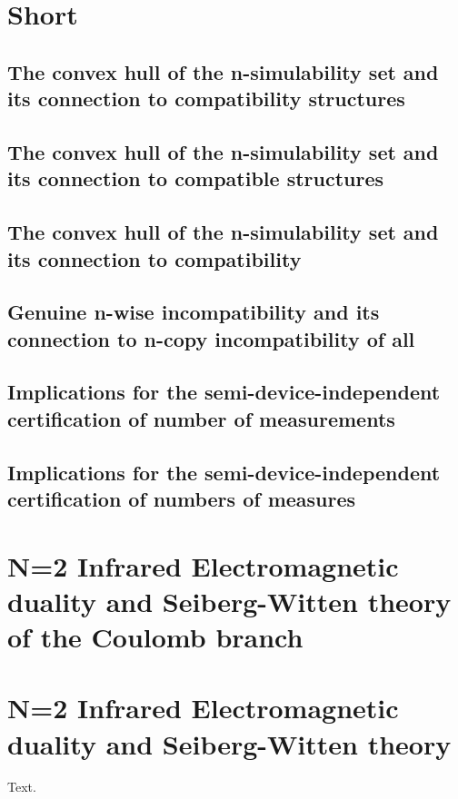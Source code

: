 \documentclass{article}
\begin{document}
\tableofcontents
\section{Short}
\subsection{The convex hull of the n-simulability set and its connection to compatibility structures}
\subsection{The convex hull of the n-simulability set and its connection to compatible structures}
\subsection{The convex hull of the n-simulability set and its connection to compatibility}
\subsection{Genuine n-wise incompatibility and its connection to n-copy incompatibility of all}
\subsection{Implications for the semi-device-independent certification of number of measurements}
\subsection{Implications for the semi-device-independent certification of numbers of measures}
\section{N=2 Infrared Electromagnetic duality and Seiberg-Witten theory of the Coulomb branch}
\section{N=2 Infrared Electromagnetic duality and Seiberg-Witten theory}
Text.
\end{document}

